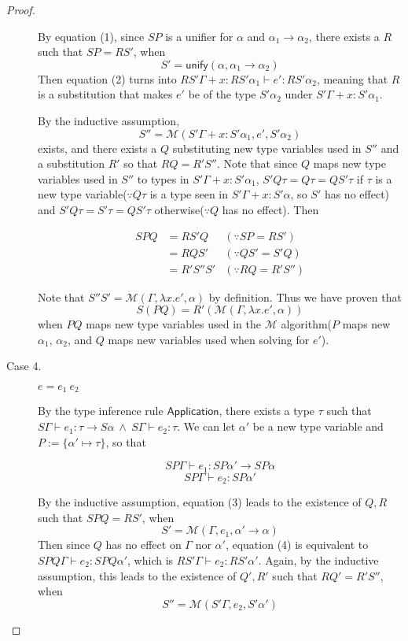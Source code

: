 \documentclass{article}
\begin{document}
\begin{proof}
\begin{description}
By equation (1), since $SP$ is a unifier for $\alpha$ and $\alpha_1\rightarrow\alpha_2$, there exists a $R$ such that $SP = RS'$, when \[S'=\mathsf{unify}(\alpha, \alpha_1\rightarrow\alpha_2)\] Then equation (2) turns into $RS'\Gamma + x : RS'\alpha_1 \vdash e' : RS'\alpha_2$, meaning that $R$ is a substitution that makes $e'$ be of the type $S'\alpha_2$ under $S'\Gamma + x : S'\alpha_1$. 

By the inductive assumption, \[S'' = \mathcal{M}(S'\Gamma + x : S'\alpha_1, e', S'\alpha_2)\] exists, and there exists a $Q$ substituting new type variables used in $S''$ and a substitution $R'$ so that $RQ = R'S''$. Note that since $Q$ maps new type variables used in $S''$ to types in $S'\Gamma + x : S'\alpha_1$, $S'Q\tau = Q\tau =  QS'\tau$ if $\tau$ is a new type variable($\because Q\tau$ is a type seen in $S'\Gamma + x : S'\alpha$, so $S'$ has no effect) and $S'Q\tau = S'\tau = QS'\tau$ otherwise($\because Q$ has no effect). Then

\begin{align}
    SPQ &= RS'Q &(\because SP = RS')\nonumber\\
        &= RQS' &(\because QS' = S'Q)\nonumber\\
        &= R'S''S' &(\because RQ = R'S'')\nonumber
\end{align}

Note that $S''S' = \mathcal{M}(\Gamma, \lambda x.e', \alpha)$ by definition. Thus we have proven that \[S(PQ) = R'(\mathcal{M}(\Gamma, \lambda x.e', \alpha))\]when $PQ$ maps new type variables used in the $\mathcal{M}$ algorithm($P$ maps new $\alpha_1$, $\alpha_2$, and $Q$ maps new variables used when solving for $e'$).

\item[Case 4.] $e = e_1 \: e_2$

By the type inference rule $\mathsf{Application}$, there exists a type $\tau$ such that $S\Gamma \vdash e_1 : \tau \rightarrow S\alpha \:\wedge\: S\Gamma \vdash e_2 : \tau$. We can let $\alpha'$ be a new type variable and $P := \{\alpha'\mapsto\tau\}$, so that

\begin{equation}
    SP\Gamma \vdash e_1 : SP\alpha' \rightarrow SP\alpha
\end{equation}
\begin{equation}
    SP\Gamma \vdash e_2 : SP\alpha'
\end{equation}

By the inductive assumption, equation (3) leads to the existence of $Q, R$ such that $SPQ = RS'$, when \[S'=\mathcal{M}(\Gamma, e_1, \alpha'\rightarrow\alpha)\] Then since $Q$ has no effect on $\Gamma$ nor $\alpha'$, equation (4) is equivalent to $SPQ\Gamma \vdash e_2 : SPQ\alpha'$, which is $RS'\Gamma \vdash e_2 : RS'\alpha'$. Again, by the inductive assumption, this leads to the existence of $Q', R'$ such that $RQ' = R'S''$, when \[S'' = \mathcal{M}(S'\Gamma, e_2, S'\alpha')\]


\end{description}
\end{proof}
\end{document}
